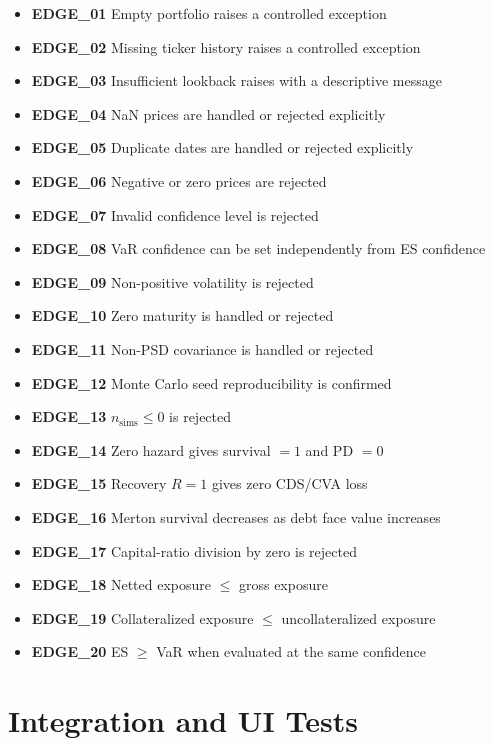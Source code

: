 \documentclass[11pt]{article}
\begin{document}
\begin{itemize}
  \item \textbf{EDGE\_01} Empty portfolio raises a controlled exception
  \item \textbf{EDGE\_02} Missing ticker history raises a controlled exception
  \item \textbf{EDGE\_03} Insufficient lookback raises with a descriptive message
  \item \textbf{EDGE\_04} NaN prices are handled or rejected explicitly
  \item \textbf{EDGE\_05} Duplicate dates are handled or rejected explicitly
  \item \textbf{EDGE\_06} Negative or zero prices are rejected
  \item \textbf{EDGE\_07} Invalid confidence level is rejected
  \item \textbf{EDGE\_08} VaR confidence can be set independently from ES confidence
  \item \textbf{EDGE\_09} Non-positive volatility is rejected
  \item \textbf{EDGE\_10} Zero maturity is handled or rejected
  \item \textbf{EDGE\_11} Non-PSD covariance is handled or rejected
  \item \textbf{EDGE\_12} Monte Carlo seed reproducibility is confirmed
  \item \textbf{EDGE\_13} $n_{\mathrm{sims}} \leq 0$ is rejected
  \item \textbf{EDGE\_14} Zero hazard gives survival $= 1$ and PD $= 0$
  \item \textbf{EDGE\_15} Recovery $R = 1$ gives zero CDS/CVA loss
  \item \textbf{EDGE\_16} Merton survival decreases as debt face value increases
  \item \textbf{EDGE\_17} Capital-ratio division by zero is rejected
  \item \textbf{EDGE\_18} Netted exposure $\leq$ gross exposure
  \item \textbf{EDGE\_19} Collateralized exposure $\leq$ uncollateralized exposure
  \item \textbf{EDGE\_20} ES $\geq$ VaR when evaluated at the same confidence
\end{itemize}

\section{Integration and UI Tests}
\end{document}

